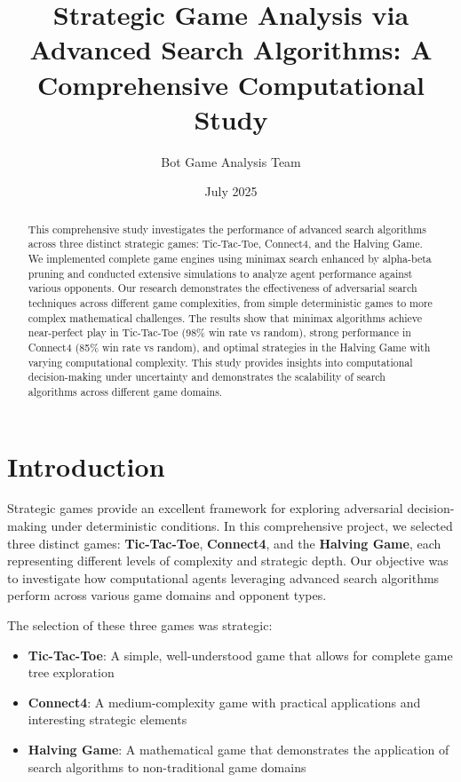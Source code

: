 \documentclass[12pt]{article}
\title{Strategic Game Analysis via Advanced Search Algorithms: A Comprehensive Computational Study}
\author{Bot Game Analysis Team}
\date{July 2025}
\begin{document}
\maketitle

\begin{abstract}
This comprehensive study investigates the performance of advanced search algorithms across three distinct strategic games: Tic-Tac-Toe, Connect4, and the Halving Game. We implemented complete game engines using minimax search enhanced by alpha-beta pruning and conducted extensive simulations to analyze agent performance against various opponents. Our research demonstrates the effectiveness of adversarial search techniques across different game complexities, from simple deterministic games to more complex mathematical challenges. The results show that minimax algorithms achieve near-perfect play in Tic-Tac-Toe (98\% win rate vs random), strong performance in Connect4 (85\% win rate vs random), and optimal strategies in the Halving Game with varying computational complexity. This study provides insights into computational decision-making under uncertainty and demonstrates the scalability of search algorithms across different game domains.
\end{abstract}

\section{Introduction}

Strategic games provide an excellent framework for exploring adversarial decision-making under deterministic conditions. In this comprehensive project, we selected three distinct games: \textbf{Tic-Tac-Toe}, \textbf{Connect4}, and the \textbf{Halving Game}, each representing different levels of complexity and strategic depth. Our objective was to investigate how computational agents leveraging advanced search algorithms perform across various game domains and opponent types.

The selection of these three games was strategic:
\begin{itemize}
    \item \textbf{Tic-Tac-Toe}: A simple, well-understood game that allows for complete game tree exploration
    \item \textbf{Connect4}: A medium-complexity game with practical applications and interesting strategic elements
    \item \textbf{Halving Game}: A mathematical game that demonstrates the application of search algorithms to non-traditional game domains
\end{itemize}
\end{document}
